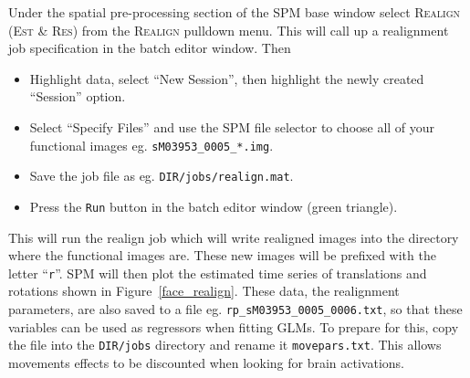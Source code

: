 Under the spatial pre-processing section of the SPM base window select \textsc{Realign (Est \& Res)} from the \textsc{Realign} pulldown menu. This will call up a realignment job specification in the batch editor window.
Then
\begin{itemize}
\item Highlight data, select ``New Session'', then highlight the newly created ``Session'' option.
\item Select ``Specify Files'' and use the SPM file selector to choose all of your functional images eg. \texttt{sM03953\_0005\_*.img}.
\item Save the job file as eg. \texttt{DIR/jobs/realign.mat}.
\item Press the \texttt{Run} button in the batch editor window (green triangle).
\end{itemize}
This will run the realign job which will write realigned images into the directory where the functional images are. These new images will be prefixed with the letter ``\texttt{r}''. SPM will then plot the estimated time series of translations and rotations shown in Figure~\ref{face_realign}. These data, the realignment parameters, are also saved to a file eg. \texttt{rp\_sM03953\_0005\_0006.txt}, so that these variables can be used as regressors when fitting GLMs. To prepare for this, copy the file into the \texttt{DIR/jobs} directory and rename it \texttt{movepars.txt}. This allows movements effects to be discounted when looking for brain activations.

